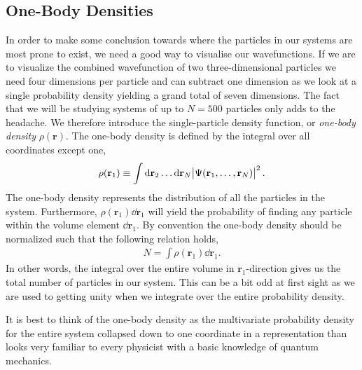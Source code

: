 \documentclass[
    a4paper, aps, twocolumn, floatfix, superscriptaddress,
    nofootinbib]{revtex4-1}
\newcommand{\vf}{\mathbf}
\newcommand{\1}{\mathds{1}}
\begin{document}
    \subsection{One-Body Densities}
        In order to make some conclusion towards where the particles in our
        systems are most prone to exist, we need a good way to visualise our
        wavefunctions. If we are to visualize the combined wavefunction of two
        three-dimensional particles we need four dimensions per particle and can
        subtract one dimension as we look at a single probability density
        yielding a grand total of seven dimensions. The fact that we will be
        studying systems of up to $N = 500$ particles only adds to the headache.
        We therefore introduce the single-particle density function, or
        \emph{one-body density} $\rho(\vf{r})$. The one-body density is defined
        by the integral over all coordinates except
        one\cite{kristiansen2017time},
        \begin{align}
            \rho(\vf{r}_1)
            \equiv
            \int \dd\vf{r}_2 \dots \dd\vf{r}_N
            \abs{\Psi(\vf{r}_1, \dots, \vf{r}_N)}^2.
        \end{align}
        The one-body density represents the distribution of all the particles in
        the system. Furthermore, $\rho(\vf{r}_1)\dd\vf{r}_1$ will yield the
        probability of finding any particle within the volume element
        $\dd\vf{r}_1$. By convention the one-body density should be normalized
        such that the following relation holds,
        \begin{align}
            N = \int \rho(\vf{r}_1)\dd\vf{r}_1.
        \end{align}
        In other words, the integral over the entire volume in
        $\vf{r}_1$-direction gives us the total number of particles in our
        system. This can be a bit odd at first sight as we are used to getting
        unity when we integrate over the entire probability
        density.\cite{hogberget2013quantum}

        It is best to think of the one-body density as the multivariate
        probability density for the entire system collapsed down to one
        coordinate in a representation than looks very familiar to every
        physicist with a basic knowledge of quantum mechanics.
\end{document}
